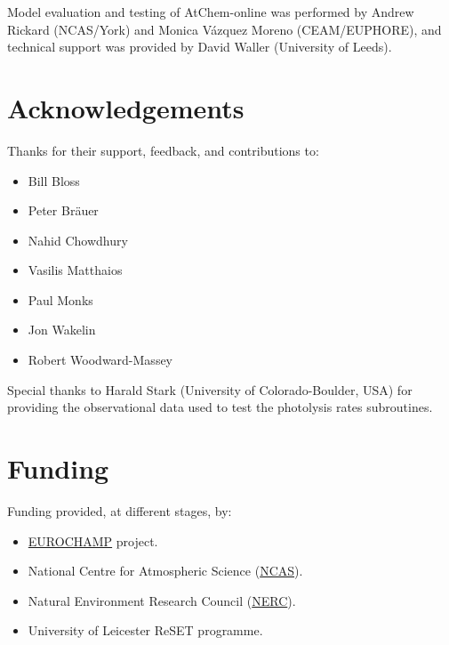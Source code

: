 Model evaluation and testing of AtChem-online was performed by Andrew
Rickard (NCAS/York) and Monica V{\'a}zquez Moreno (CEAM/EUPHORE), and
technical support was provided by David Waller (University of Leeds).

\section{Acknowledgements} \label{sec:acknowledgements}

Thanks for their support, feedback, and contributions to:

\begin{itemize}
\item Bill Bloss
\item Peter Br{\"a}uer
\item Nahid Chowdhury
\item Vasilis Matthaios
\item Paul Monks
\item Jon Wakelin
\item Robert Woodward-Massey
\end{itemize}

Special thanks to Harald Stark (University of Colorado-Boulder, USA)
for providing the observational data used to test the photolysis rates
subroutines.

\section{Funding} \label{sec:funding}

Funding provided, at different stages, by:

\begin{itemize}
\item \href{https://www.eurochamp.org/}{EUROCHAMP} project.
\item National Centre for Atmospheric Science
  (\href{https://www.ncas.ac.uk/}{NCAS}).
\item Natural Environment Research Council
  (\href{https://nerc.ukri.org/}{NERC}).
\item University of Leicester ReSET programme.
\end{itemize}
